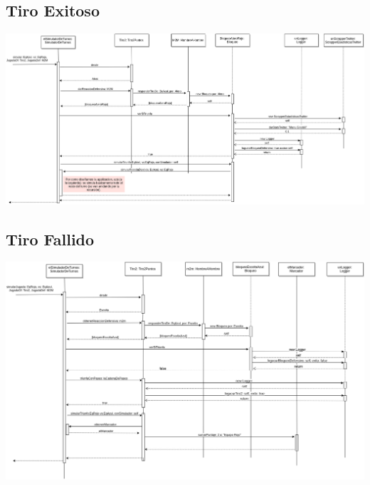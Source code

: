 \subsection{Tiro Exitoso}
\includegraphics[width=\textwidth]{imgs/TiroExitoso.png}
\subsection{Tiro Fallido}
\includegraphics[width=\textwidth]{imgs/TiroFallido.png}

